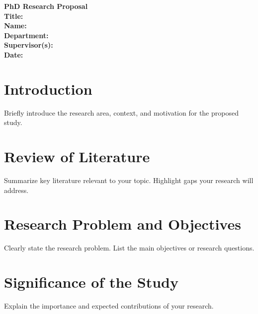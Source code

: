 \documentclass[12pt,a4paper]{article}
\begin{document}
\begin{center}
    \textbf{\LARGE{PhD Research Proposal}}\\[1.5em]
    \textbf{Title:} \underline{\hspace{10cm}}\\[1em]
    \textbf{Name:} \underline{\hspace{8cm}}\\[1em]
    \textbf{Department:} \underline{\hspace{7cm}}\\[1em]
    \textbf{Supervisor(s):} \underline{\hspace{7cm}}\\[1em]
    \textbf{Date:} \underline{\hspace{5cm}}
\end{center}

\vspace{2em}

\section{Introduction}
\begin{spacing}{1.2}
Briefly introduce the research area, context, and motivation for the proposed study.
\end{spacing}

\section{Review of Literature}
\begin{spacing}{1.2}
Summarize key literature relevant to your topic. Highlight gaps your research will address.
\end{spacing}

\section{Research Problem and Objectives}
\begin{spacing}{1.2}
Clearly state the research problem. List the main objectives or research questions.
\end{spacing}

\section{Significance of the Study}
\begin{spacing}{1.2}
Explain the importance and expected contributions of your research.
\end{spacing}
\end{document}
